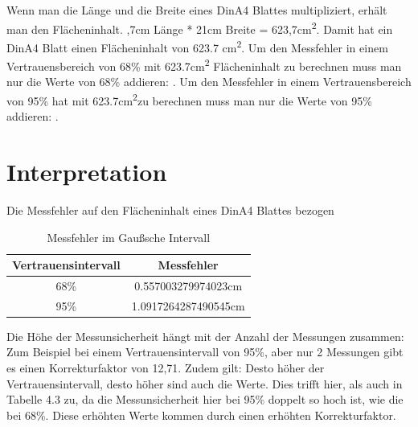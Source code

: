 \documentclass[12pt, oneside, a4paper, \docLanguage]{report}
\begin{document}
\newpage
Wenn man die Länge und die Breite eines DinA4 Blattes multipliziert, erhält man den 
\newline
Flächeninhalt. 
,7cm Länge * 21cm Breite = 623,7cm\textsuperscript{2}.
\newline
Damit hat ein DinA4 Blatt einen Flächeninhalt von 623.7 cm\textsuperscript{2}.
\newline
\newline
Um den Messfehler in einem Vertrauensbereich von 68\% mit 623.7cm\textsuperscript{2} Flächeninhalt zu berechnen muss man nur die Werte von 68\% addieren: 
\newline
0.557003279974023cm.
\newline
Um den Messfehler in einem Vertrauensbereich von 95\% hat mit 623.7cm\textsuperscript{2}zu berechnen muss man nur die Werte von 95\% addieren: 
\newline
1.0917264287490545cm.
\section{Interpretation}
\label{chap:VERSUCH_3_INTERPRETATION}
Die Messfehler auf den Flächeninhalt eines DinA4 Blattes bezogen
\newline
\begin{table}[H]
	\centering\small
	\begin{tabular}{|c|c|}
		\hline
		Vertrauensintervall &  Messfehler \\
		\hline
		68\% & 0.557003279974023cm \\
		\hline
		95\%  & 1.0917264287490545cm \\
		\hline
	\end{tabular}
	\caption{Messfehler im Gaußsche Intervall}
	\label{fig:VERSUCH_3_FLACHENINHALT_VERTRAUENSINTERVALL}
\end{table}
Die Höhe der Messunsicherheit hängt mit der Anzahl der Messungen zusammen: Zum Beispiel bei einem Vertrauensintervall von 95\%, aber nur 2 Messungen gibt es einen Korrekturfaktor von 12,71.
\newline
Zudem gilt: Desto höher der Vertrauensintervall, desto höher sind auch die Werte.
Dies trifft hier, als auch in Tabelle 4.3 zu, da die Messunsicherheit hier bei 95\% doppelt so hoch ist, wie die bei 68\%.
\newline
Diese erhöhten Werte kommen durch einen erhöhten Korrekturfaktor.

\newline
\end{document}
